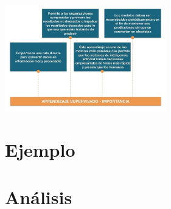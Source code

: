 \documentclass[%
 reprint,
 amsmath,amssymb,
 aps,
]{revtex4-1}
\begin{document}
{ \begin{center}
\includegraphics[width=7cm]{./Imagenes/importancia}
\end{center}



\section{Ejemplo}

\section{Análisis}

}
\end{document}

